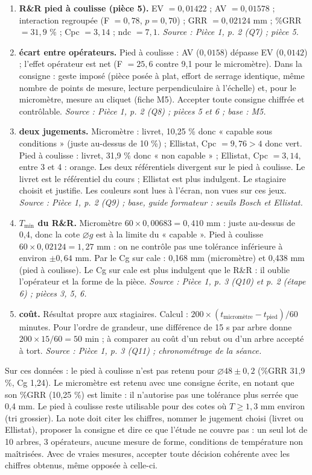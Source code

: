 \documentclass[10pt,a4paper]{article}
\newcommand{\src}[1]{{\footnotesize\color{uimm}\textit{Source : #1}}}
\begin{document}
\begin{enumerate}[label=\textcolor{cyan}{\textbf{Q\arabic*.}},leftmargin=22pt,itemsep=5pt]
\item \textbf{R\&R pied à coulisse (pièce 5).} EV $= 0{,}01422$ ; AV $= 0{,}01578$ ; interaction regroupée (F $= 0{,}78$, $p = 0{,}70$) ; GRR $= 0{,}02124$ mm ; \%GRR $= 31{,}9$ \% ; Cpc $= 3{,}14$ ; ndc $= 7{,}1$. \src{Pièce 1, p. 2 (Q7) ; pièce 5.}
\item \textbf{écart entre opérateurs.} Pied à coulisse : AV ($0{,}0158$) dépasse EV ($0{,}0142$) ; l'effet opérateur est net (F $= 25{,}6$ contre 9,1 pour le micromètre). Dans la consigne : geste imposé (pièce posée à plat, effort de serrage identique, même nombre de points de mesure, lecture perpendiculaire à l'échelle) et, pour le micromètre, mesure au cliquet (fiche M5). Accepter toute consigne chiffrée et contrôlable. \src{Pièce 1, p. 2 (Q8) ; pièces 5 et 6 ; base : M5.}
\item \textbf{deux jugements.} Micromètre : livret, 10,25 \% donc « capable sous conditions » (juste au-dessus de 10 \%) ; Ellistat, Cpc $= 9{,}76 > 4$ donc vert. Pied à coulisse : livret, 31,9 \% donc « non capable » ; Ellistat, Cpc $= 3{,}14$, entre 3 et 4 : orange. Les deux référentiels divergent sur le pied à coulisse. Le livret est le référentiel du cours ; Ellistat est plus indulgent. Le stagiaire choisit et justifie. Les couleurs sont lues à l'écran, non vues sur ces jeux. \src{Pièce 1, p. 2 (Q9) ; base, guide formateur : seuils Bosch et Ellistat.}
\item \textbf{$T_{\min}$ du R\&R.} Micromètre $60 \times 0{,}00683 = 0{,}410$ mm : juste au-dessus de 0,4, donc la cote $\varnothing g$ est à la limite du « capable ». Pied à coulisse $60 \times 0{,}02124 = 1{,}27$ mm : on ne contrôle pas une tolérance inférieure à environ $\pm 0{,}64$ mm. Par le Cg sur cale : 0,168 mm (micromètre) et 0,438 mm (pied à coulisse). Le Cg sur cale est plus indulgent que le R\&R : il oublie l'opérateur et la forme de la pièce. \src{Pièce 1, p. 3 (Q10) et p. 2 (étape 6) ; pièces 3, 5, 6.}
\item \textbf{coût.} Résultat propre aux stagiaires. Calcul : $200 \times (t_{\text{micromètre}} - t_{\text{pied}}) / 60$ minutes. Pour l'ordre de grandeur, une différence de 15 s par arbre donne $200 \times 15 / 60 = 50$ min ; à comparer au coût d'un rebut ou d'un arbre accepté à tort. \src{Pièce 1, p. 3 (Q11) ; chronométrage de la séance.}
\end{enumerate}

Sur ces données : le pied à coulisse n'est pas retenu pour $\varnothing 48 \pm 0{,}2$ (\%GRR 31,9 \%, Cg 1,24). Le micromètre est retenu avec une consigne écrite, en notant que son \%GRR (10,25 \%) est limite : il n'autorise pas une tolérance plus serrée que 0,4 mm. Le pied à coulisse reste utilisable pour des cotes où $T \ge 1{,}3$ mm environ (tri grossier). La note doit citer les chiffres, nommer le jugement choisi (livret ou Ellistat), proposer la consigne et dire ce que l'étude ne couvre pas : un seul lot de 10 arbres, 3 opérateurs, aucune mesure de forme, conditions de température non maîtrisées. Avec de vraies mesures, accepter toute décision cohérente avec les chiffres obtenus, même opposée à celle-ci.
\end{document}
